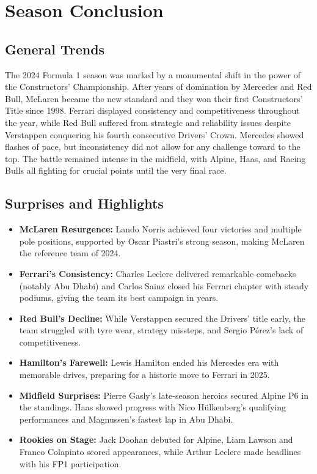 \documentclass{article}
\begin{document}
\section*{Season Conclusion}

\subsection*{General Trends}

The 2024 Formula 1 season was marked by a monumental shift in the power of the Constructors' Championship.
After years of domination by Mercedes and Red Bull, McLaren became the new standard and they won their first Constructors' Title since 1998.
Ferrari displayed consistency and competitiveness throughout the year, while Red Bull suffered from strategic and reliability issues despite Verstappen conquering his fourth consecutive Drivers' Crown. 
Mercedes showed flashes of pace, but inconsistency did not allow for any challenge toward to the top. 
The battle remained intense in the midfield, with Alpine, Haas, and Racing Bulls all fighting for crucial points until the very final race.

\subsection*{Surprises and Highlights}

\begin{itemize}
    \item \textbf{McLaren Resurgence:} Lando Norris achieved four victories and multiple pole positions, supported by Oscar Piastri’s strong season, making McLaren the reference team of 2024.
    \item \textbf{Ferrari’s Consistency:} Charles Leclerc delivered remarkable comebacks (notably Abu Dhabi) and Carlos Sainz closed his Ferrari chapter with steady podiums, giving the team its best campaign in years.
    \item \textbf{Red Bull’s Decline:} While Verstappen secured the Drivers’ title early, the team struggled with tyre wear, strategy missteps, and Sergio Pérez’s lack of competitiveness.
    \item \textbf{Hamilton’s Farewell:} Lewis Hamilton ended his Mercedes era with memorable drives, preparing for a historic move to Ferrari in 2025.
    \item \textbf{Midfield Surprises:} Pierre Gasly’s late-season heroics secured Alpine P6 in the standings. Haas showed progress with Nico Hülkenberg’s qualifying performances and Magnussen’s fastest lap in Abu Dhabi. 
    \item \textbf{Rookies on Stage:} Jack Doohan debuted for Alpine, Liam Lawson and Franco Colapinto scored appearances, while Arthur Leclerc made headlines with his FP1 participation.
\end{itemize}
\end{document}
